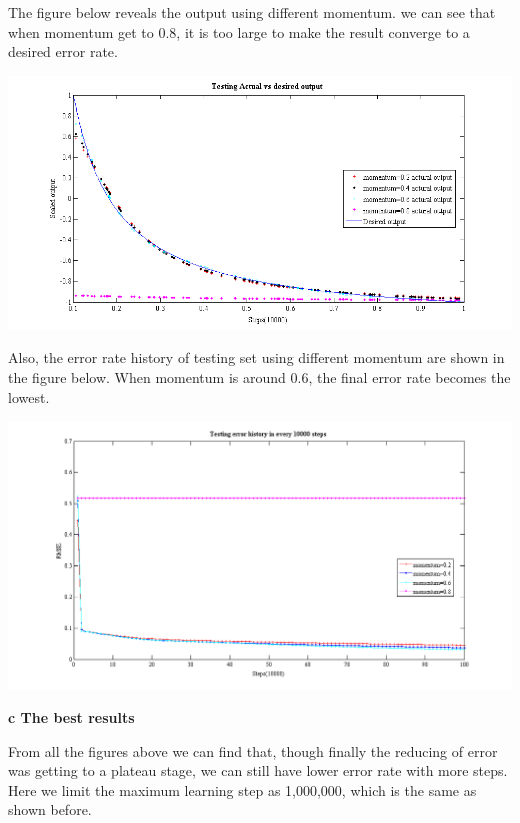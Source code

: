 \documentclass[epsfig]{article}
\def\bpar{\vskip26pt}
\def\npar{\vskip13pt}
\begin{document}
The figure below reveals the output using different momentum. we can see that when momentum get to 0.8, it is too large to make the result converge to a desired error rate.


	\centerline{\includegraphics[width=6.5in]{momentum_output.png}} 


Also, the error rate history of testing set using different momentum are shown in the figure below. When momentum is around 0.6, the final error rate becomes the lowest.


	\centerline{\includegraphics[width=6.5in]{momentum_error.png}} 


\clearpage

{\bf 
	\npar
	c The best results
	\bpar
}

From all the figures above we can find that, though finally the reducing of error was getting to a plateau stage, we can still have lower error rate with more steps. Here we limit the maximum learning step as 1,000,000, which is the same as shown before. 
\end{document}
